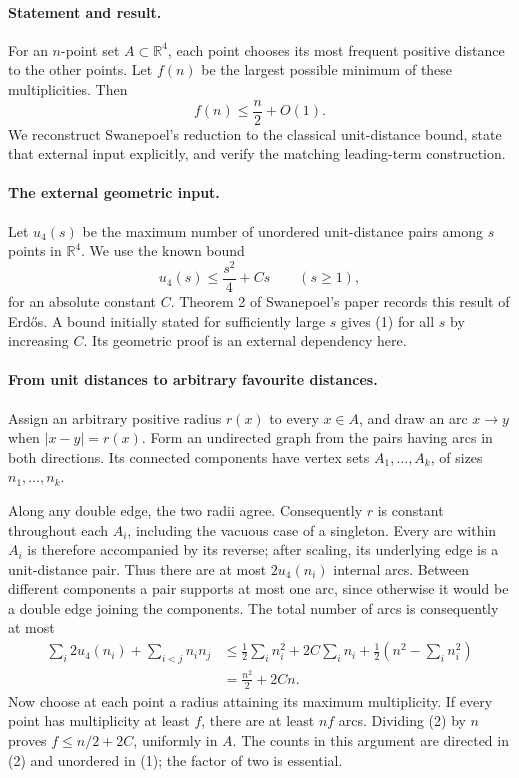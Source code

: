 \paragraph{Statement and result.}
For an \(n\)-point set \(A\subset\mathbb R^4\), each point chooses its most frequent positive distance to the other points. Let \(f(n)\) be the largest possible minimum of these multiplicities. Then
\[
 f(n)\leq \frac n2+O(1).
\]
We reconstruct Swanepoel's reduction to the classical unit-distance bound, state that external input explicitly, and verify the matching leading-term construction.

\paragraph{The external geometric input.}
Let \(u_4(s)\) be the maximum number of unordered unit-distance pairs among \(s\) points in \(\mathbb R^4\). We use the known bound
\[
 u_4(s)\leq \frac{s^2}{4}+Cs\qquad(s\geq1), \tag{1}
\]
for an absolute constant \(C\). Theorem 2 of Swanepoel's paper records this result of Erd\H{o}s. A bound initially stated for sufficiently large \(s\) gives (1) for all \(s\) by increasing \(C\). Its geometric proof is an external dependency here.

\paragraph{From unit distances to arbitrary favourite distances.}
Assign an arbitrary positive radius \(r(x)\) to every \(x\in A\), and draw an arc \(x\to y\) when \(|x-y|=r(x)\). Form an undirected graph from the pairs having arcs in both directions. Its connected components have vertex sets \(A_1,\ldots,A_k\), of sizes \(n_1,\ldots,n_k\).

Along any double edge, the two radii agree. Consequently \(r\) is constant throughout each \(A_i\), including the vacuous case of a singleton. Every arc within \(A_i\) is therefore accompanied by its reverse; after scaling, its underlying edge is a unit-distance pair. Thus there are at most \(2u_4(n_i)\) internal arcs. Between different components a pair supports at most one arc, since otherwise it would be a double edge joining the components. The total number of arcs is consequently at most
\[
 \begin{aligned}
 \sum_i2u_4(n_i)+\sum_{i<j}n_i n_j
 &\leq \frac12\sum_i n_i^2+2C\sum_i n_i
           +\frac12\left(n^2-\sum_i n_i^2\right)\\
 &=\frac{n^2}{2}+2Cn. \tag{2}
 \end{aligned}
\]
Now choose at each point a radius attaining its maximum multiplicity. If every point has multiplicity at least \(f\), there are at least \(nf\) arcs. Dividing (2) by \(n\) proves \(f\leq n/2+2C\), uniformly in \(A\). The counts in this argument are directed in (2) and unordered in (1); the factor of two is essential.

